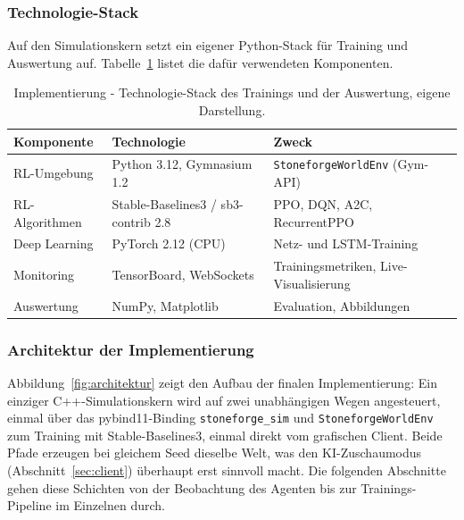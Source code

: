 \documentclass[11pt,a4paper]{article}
\begin{document}
\subsubsection{Technologie-Stack}
\label{sec:technik_rl}

Auf den Simulationskern setzt ein eigener Python-Stack für Training und
Auswertung auf. Tabelle~\ref{tab:stack_rl} listet die dafür verwendeten
Komponenten.

\begin{table}[h]
\centering
\footnotesize
\begin{tabular}{@{}lll@{}}
\toprule
\textbf{Komponente} & \textbf{Technologie} & \textbf{Zweck} \\
\midrule
RL-Umgebung & Python 3.12, Gymnasium 1.2 & \texttt{StoneforgeWorldEnv} (Gym-API) \\
RL-Algorithmen & Stable-Baselines3 / sb3-contrib 2.8 & PPO, DQN, A2C, RecurrentPPO \\
Deep Learning & PyTorch 2.12 (CPU) & Netz- und LSTM-Training \\
Monitoring & TensorBoard, WebSockets & Trainingsmetriken, Live-Visualisierung \\
Auswertung & NumPy, Matplotlib & Evaluation, Abbildungen \\
\bottomrule
\end{tabular}
\caption[Technologie-Stack: Reinforcement Learning]{Implementierung -
Technologie-Stack des Trainings und der Auswertung, eigene Darstellung.}
\label{tab:stack_rl}
\end{table}

\subsubsection{Architektur der Implementierung}
\label{sec:architektur}

Abbildung~\ref{fig:architektur} zeigt den Aufbau der finalen Implementierung:
Ein einziger C++-Simulationskern wird auf zwei unabhängigen Wegen angesteuert,
einmal über das pybind11-Binding \texttt{stoneforge\_sim} und
\texttt{StoneforgeWorldEnv} zum Training mit Stable-Baselines3, einmal direkt
vom grafischen Client. Beide Pfade erzeugen bei gleichem Seed dieselbe Welt,
was den KI-Zuschaumodus (Abschnitt~\ref{sec:client}) überhaupt erst sinnvoll
macht. Die folgenden Abschnitte gehen diese Schichten von der Beobachtung des
Agenten bis zur Trainings-Pipeline im Einzelnen durch.
\end{document}
